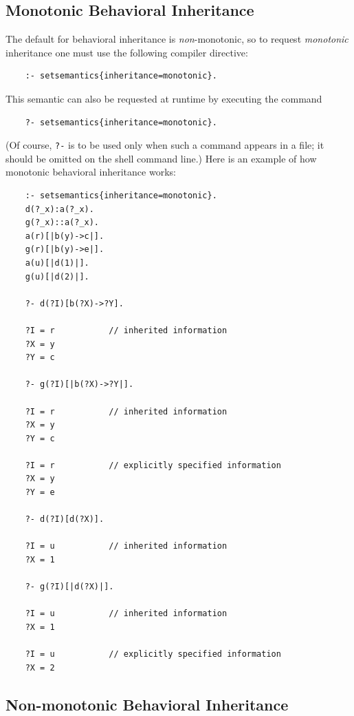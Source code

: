 \documentclass[11pt]{article}
\newcommand{\ERGO}{\mbox{\smaller{\ensuremath{\cal{E}}\smaller{{\sc{RGO}}}}}\xspace}
\newcommand{\FLSYSTEM}{\ERGO}
\begin{document}
\subsection{Monotonic Behavioral Inheritance}

The default for behavioral inheritance is \emph{non}-monotonic, so to request
\emph{monotonic} inheritance one must use the following compiler directive:
\begin{verbatim}
    :- setsemantics{inheritance=monotonic}.
\end{verbatim}
This semantic can also be requested at runtime by executing the command
\begin{verbatim}
    ?- setsemantics{inheritance=monotonic}.
\end{verbatim}
(Of course, \texttt{?-} is to be used only when such a command appears in a
file; it should be omitted on the \FLSYSTEM shell command line.) 
Here is an example of how monotonic behavioral inheritance works:
\begin{verbatim}
    :- setsemantics{inheritance=monotonic}.
    d(?_x):a(?_x).
    g(?_x)::a(?_x).
    a(r)[|b(y)->c|].
    g(r)[|b(y)->e|].
    a(u)[|d(1)|].
    g(u)[|d(2)|].

    ?- d(?I)[b(?X)->?Y].

    ?I = r           // inherited information
    ?X = y
    ?Y = c

    ?- g(?I)[|b(?X)->?Y|].

    ?I = r           // inherited information
    ?X = y
    ?Y = c

    ?I = r           // explicitly specified information
    ?X = y
    ?Y = e

    ?- d(?I)[d(?X)].

    ?I = u           // inherited information
    ?X = 1

    ?- g(?I)[|d(?X)|].

    ?I = u           // inherited information
    ?X = 1

    ?I = u           // explicitly specified information
    ?X = 2
\end{verbatim}

\subsection{Non-monotonic Behavioral Inheritance}
\end{document}
